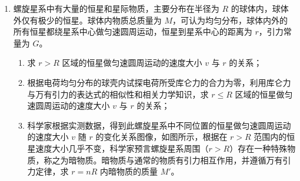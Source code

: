 \documentclass[\gkver]{gaokaozhenti}
\begin{document}
\begin{enumerate}
{$q\frac{U_{2}}{d} = kRv_{m}$

颗粒在板间运动的时间仍为 $t = \frac{L}{v_{0}}$，恰好全部被收集时 $v_{m}t = d$，联立解得

$U_{2} = \frac{d^{2}kRv_{0}}{qL}$

b．设颗粒的半径为 $r$，电荷量 $q = cr^{2}$（$c$ 为常量）。由 $q\frac{U}{d} = krv_{m}$ 得颗粒垂直于板方向的速度

$v_{m} = \frac{cUr}{kd}$

即 $v_{m}$ 与 $r$ 成正比。直径为 2.5 $\mu$m 的颗粒的半径是直径为 10 $\mu$m 的颗粒的 $\frac{1}{4}$，在板间运动的时间相同，所以它垂直于板方向运动的距离是后者的 $\frac{1}{4}$，即 $\frac{d}{4}$。只有进入收集器时距正极板 $\frac{d}{4}$ 以内的 2.5 $\mu$m 颗粒能被收集，气流均匀混合，所以被收集的百分比为 25\%。
}

\item
螺旋星系中有大量的恒星和星际物质，主要分布在半径为 $R$ 的球体内，球体外仅有极少的恒星。球体内物质总质量为 $M$，可认为均匀分布，球体内外的所有恒星都绕星系中心做匀速圆周运动，恒星到星系中心的距离为 $r$，引力常量为 $G$。
\begin{enumerate}
	\item
	求 $r > R$ 区域的恒星做匀速圆周运动的速度大小 $v$ 与 $r$ 的关系；
	\item
	根据电荷均匀分布的球壳内试探电荷所受库仑力的合力为零，利用库仑力与万有引力的表达式的相似性和相关力学知识，求 $r \leq R$ 区域的恒星做匀速圆周运动的速度大小 $v$ 与 $r$ 的关系；
	\item
	科学家根据实测数据，得到此螺旋星系中不同位置的恒星做匀速圆周运动的速度大小 $v$ 随 $r$ 的变化关系图像，如图所示，根据在 $r > R$ 范围内的恒星速度大小几乎不变，科学家预言螺旋星系周围（$r > R$）存在一种特殊物质，称之为暗物质。暗物质与通常的物质有引力相互作用，并遵循万有引力定律，求 $r = nR$ 内暗物质的质量 $M'$。
\end{enumerate}
\end{enumerate}
\end{document}
